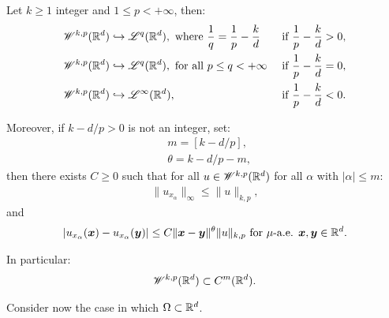 \begin{corollary} \label{corollary:embedding}
    Let $k \geq 1$ integer and $1 \leq p < +\infty$, then:
    \begin{align}
        & \mathscr{W}^{k, p}(\mathbb{R}^{d}) \hookrightarrow \mathscr{L}^{q}(\mathbb{R}^{d}), \text{ where } \frac{1}{q} = \frac{1}{p} - \frac{k}{d} & \text{ if } \frac{1}{p} - \frac{k}{d} > 0, \\
        & \mathscr{W}^{k, p}(\mathbb{R}^{d}) \hookrightarrow \mathscr{L}^{q}(\mathbb{R}^{d}), \text{ for all } p \leq q < +\infty & \text{ if } \frac{1}{p} - \frac{k}{d} = 0, \\
        & \mathscr{W}^{k, p}(\mathbb{R}^{d}) \hookrightarrow \mathscr{L}^{\infty}(\mathbb{R}^{d}), & \text{ if } \frac{1}{p} - \frac{k}{d} < 0.
    \end{align}

    Moreover, if $k - d/p > 0$ is not an integer, set:
    \begin{align}
        & m = \left[ k - d/p \right], \\
        & \theta = k - d/p - m,
    \end{align}
    then there exists $C \geq 0$ such that for all $u \in \mathscr{W}^{k, p}(\mathbb{R}^{d})$ for all $\alpha$ with $\lvert \alpha \rvert \leq m$:
    \begin{gather}
        \lVert u_{x_{\alpha}} \rVert_{\infty} \leq \lVert u \rVert_{k, p},
    \end{gather}
    and
    \begin{gather}
        \lvert u_{x_{\alpha}}(\bm{x}) - u_{x_{\alpha}}(\bm{y}) \rvert \leq C \lVert \bm{x} - \bm{y} \rVert^{\theta} \lVert u \rVert_{k, p} \text{ for } \mu \text{-a.e. } \bm{x}, \bm{y} \in \mathbb{R}^{d}.
    \end{gather}

    In particular:
    \begin{gather}
        \mathscr{W}^{k, p}(\mathbb{R}^{d}) \subset C^m(\mathbb{R}^{d}).
    \end{gather}
\end{corollary}

Consider now the case in which $\Omega \subset \mathbb{R}^{d}$.

